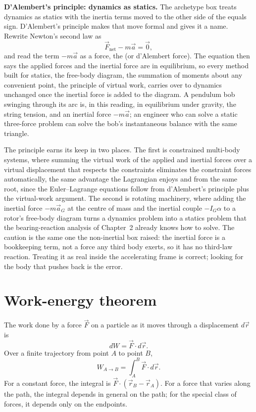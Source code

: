 \begin{mastery}
\textbf{D'Alembert's principle: dynamics as statics.} The archetype box
treats dynamics as statics with the inertia terms moved to the other
side of the equals sign. D'Alembert's principle makes that move formal
and gives it a name. Rewrite Newton's second law as
\[
\vec{F}_{\text{net}}-m\vec{a}=\vec{0},
\]
and read the term $-m\vec{a}$ as a force, the 
(or d'Alembert force). The equation then says the applied forces and the
inertial force are in equilibrium, so every method built for statics, the
free-body diagram, the summation of moments about any convenient point,
the principle of virtual work, carries over to dynamics unchanged once
the inertial force is added to the diagram. A pendulum bob swinging
through its arc is, in this reading, in equilibrium under gravity, the
string tension, and an inertial force $-m\vec{a}$; an engineer who can
solve a static three-force problem can solve the bob's instantaneous
balance with the same triangle.

The principle earns its keep in two places. The first is constrained
multi-body systems, where summing the virtual work of the applied and
inertial forces over a virtual displacement that respects the constraints
eliminates the constraint forces automatically, the same advantage the
Lagrangian enjoys and from the same root, since the Euler--Lagrange
equations follow from d'Alembert's principle plus the virtual-work
argument. The second is rotating machinery, where adding the inertial
force $-m\vec{a}_{G}$ at the centre of mass and the inertial couple
$-I_{G}\alpha$ to a rotor's free-body diagram turns a dynamics problem
into a statics problem that the bearing-reaction analysis of Chapter~2
already knows how to solve. The caution is the same one the non-inertial
box raised: the inertial force is a bookkeeping term, not a force any
third body exerts, so it has no third-law reaction. Treating it as real
inside the accelerating frame is correct; looking for the body that
pushes back is the error.
\end{mastery}

\section{Work-energy theorem}

The work done by a force $\vec{F}$ on a particle as it moves through
a displacement $d\vec{r}$ is
\[
dW = \vec{F} \cdot d\vec{r}.
\]
Over a finite trajectory from point $A$ to point $B$,
\[
W_{A \to B} = \int_A^B \vec{F} \cdot d\vec{r}.
\]
For a constant force, the integral is $\vec{F} \cdot (\vec{r}_B -
\vec{r}_A)$. For a force that varies along the path, the integral
depends in general on the path; for the special class of
 forces, it depends only on the endpoints.

